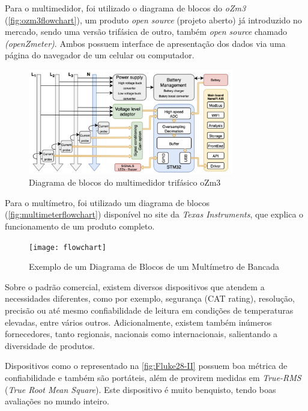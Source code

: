 Para o multimedidor, foi utilizado o diagrama de blocos do \textit{oZm3} (\autoref{fig:ozm3flowchart}), um produto \textit{open source} (projeto aberto) já introduzido no mercado, sendo uma versão trifásica de outro, também \textit{open source} chamado \textit{(openZmeter)}. Ambos possuem interface de apresentação dos dados via uma página do navegador de um celular ou computador.

\begin{figure}[htb!]
    \caption{Diagrama de blocos do multimedidor trifásico oZm3}
    \label{fig:ozm3flowchart}
    \includegraphics[width=0.8\textwidth]{figuras/openzmeter-diagrama.png}
\end{figure}

Para o multímetro, foi utilizado um diagrama de blocos (\autoref{fig:multimeterflowchart}) disponível no site da \textit{Texas Instruments}, que explica o funcionamento de um produto completo.

\begin{figure}[htb!]%
    \caption{Exemplo de um Diagrama de Blocos de um Multímetro de Bancada}%
    \label{fig:multimeterflowchart}%
    \texttt{[image: flowchart]}%
\end{figure}

Sobre o padrão comercial, existem diversos dispositivos que atendem a necessidades diferentes, como por exemplo, segurança (CAT rating), resolução, precisão ou até mesmo confiabilidade de leitura em condições de temperaturas elevadas, entre vários outros. Adicionalmente, existem também inúmeros fornecedores, tanto regionais, nacionais como internacionais, salientando a diversidade de produtos.

Dispositivos como o representado na \autoref{fig:Fluke28-II} possuem boa métrica de confiabilidade e também são portáteis, além de provirem medidas em \textit{True-RMS} (\textit{True Root Mean Square}). Este dispositivo é muito benquisto, tendo boas avaliações no mundo inteiro.

